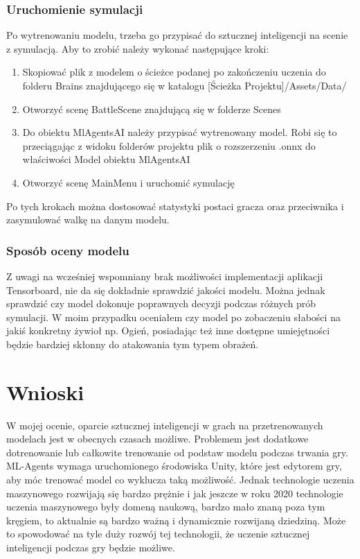 \documentclass{SGGW-thesis}
\begin{document}
\subsection{Uruchomienie symulacji}
Po wytrenowaniu modelu, trzeba go przypisać do sztucznej inteligencji na scenie z symulacją. Aby to zrobić należy wykonać następujące kroki:
\begin{enumerate}
  \item{Skopiować plik z modelem o ścieżce podanej po zakończeniu uczenia do folderu Brains znajdującego się w katalogu [Ścieżka Projektu]/Assets/Data/}
  \item{Otworzyć scenę BattleScene znajdującą się w folderze Scenes}
  \item{Do obiektu MlAgentsAI należy przypisać wytrenowany model. Robi się to przeciągając z widoku folderów projektu plik o rozszerzeniu .onnx do właściwości Model obiektu MlAgentsAI}
  \item{Otworzyć scenę MainMenu i uruchomić symulację}
\end{enumerate}
Po tych krokach można dostosować statystyki postaci gracza oraz przeciwnika i zasymulować walkę na danym modelu.

\subsection{Sposób oceny modelu}
Z uwagi na wcześniej wspomniany brak możliwości implementacji aplikacji Tensorboard, nie da się dokładnie sprawdzić jakości modelu. Można jednak sprawdzić czy model dokonuje poprawnych decyzji podczas różnych prób symulacji.
W moim przypadku oceniałem czy model po zobaczeniu słabości na jakiś konkretny żywioł np. Ogień, posiadając też inne dostępne umiejętności będzie bardziej skłonny do atakowania tym typem obrażeń. 

\chapter{Wnioski}
W mojej ocenie, oparcie sztucznej inteligencji w grach na przetrenowanych modelach jest w obecnych czasach możliwe. Problemem jest dodatkowe dotrenowanie lub całkowite trenowanie od podstaw modelu podczas trwania gry.
ML-Agents wymaga uruchomionego środowiska Unity, które jest edytorem gry, aby móc trenować model co wyklucza taką możliwość. Jednak technologie uczenia maszynowego rozwijają się bardzo prężnie i jak jeszcze w roku 2020 technologie
uczenia maszynowego były domeną naukową, bardzo mało znaną poza tym kręgiem, to aktualnie są bardzo ważną i dynamicznie rozwijaną dziedziną. Może to spowodować na tyle duży rozwój tej technologii, że uczenie sztucznej inteligencji
podczas gry będzie możliwe.
\end{document}
